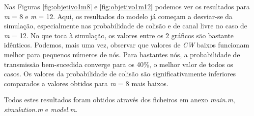 Nas Figuras \ref{fig:objetivo1m8} e \ref{fig:objetivo1m12} podemos ver os resultados para
\textit{m} = 8 e \textit{m} = 12. Aqui, os resultados do modelo já começam a desviar-se
da simulação, especialmente nas probabilidade de colisão e de canal livre
no caso de \textit{m} = 12.
No que toca à simulação, os valores entre os 2 gráficos são bastante idênticos.
Podemos, mais uma vez, observar que valores de \textit{CW} baixos funcionam melhor
para pequenos números de nós. Para bastantes nós, a probabilidade de transmissão
bem-sucedida converge para os 40\%, o melhor valor de todos os casos. Os valores da
probabilidade de colisão são significativamente inferiores comparados a valores
obtidos para \textit{m} = 8 mais baixos.

\vspace{\baselineskip}

Todos estes resultados foram obtidos através dos ficheiros em anexo
\textit{main.m}, \textit{simulation.m} e \textit{model.m}.